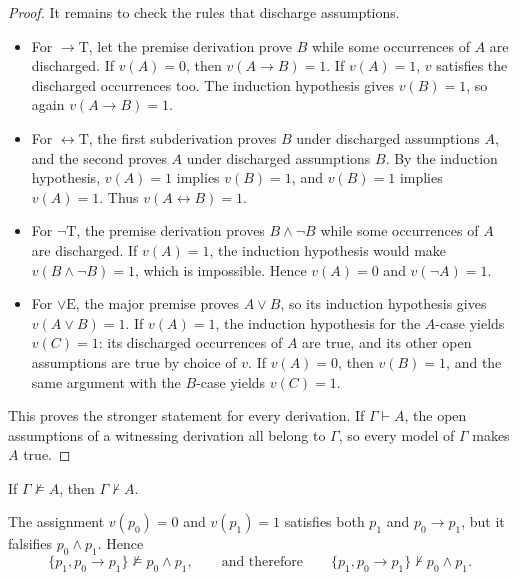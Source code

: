 \documentclass[11pt,a4paper]{amsart}
\begin{document}
\begin{proof}
  It remains to check the rules that discharge assumptions.
  \begin{itemize}
    \item For \(\to\mathrm T\), let the premise derivation prove \(B\)
      while some occurrences of \(A\) are discharged. If \(v(A)=0\), then
      \(v(A\to B)=1\). If \(v(A)=1\), \(v\) satisfies the discharged
      occurrences too. The induction hypothesis gives \(v(B)=1\), so
      again \(v(A\to B)=1\).
    \item For \(\leftrightarrow\mathrm T\), the first subderivation proves
      \(B\) under discharged assumptions \(A\), and the second proves
      \(A\) under discharged assumptions \(B\). By the induction
      hypothesis, \(v(A)=1\) implies \(v(B)=1\), and \(v(B)=1\) implies
      \(v(A)=1\). Thus \(v(A\leftrightarrow B)=1\).
    \item For \(\neg\mathrm T\), the premise derivation proves
      \(B\land\neg B\) while some occurrences of \(A\) are discharged.
      If \(v(A)=1\), the induction hypothesis would make
      \(v(B\land\neg B)=1\), which is impossible. Hence \(v(A)=0\) and
      \(v(\neg A)=1\).
    \item For \(\lor\mathrm E\), the major premise proves \(A\lor B\),
      so its induction hypothesis gives \(v(A\lor B)=1\). If \(v(A)=1\),
      the induction hypothesis for the \(A\)-case yields \(v(C)=1\): its
      discharged occurrences of \(A\) are true, and its other open
      assumptions are true by choice of \(v\). If \(v(A)=0\), then
      \(v(B)=1\), and the same argument with the \(B\)-case yields
      \(v(C)=1\).
  \end{itemize}
  This proves the stronger statement for every derivation. If
  \(\Gamma\vdash A\), the open assumptions of a witnessing derivation all
  belong to \(\Gamma\), so every model of \(\Gamma\) makes \(A\) true.
\end{proof}

\begin{corollary}
  If \(\Gamma\not\models A\), then \(\Gamma\not\vdash A\).
\end{corollary}

\begin{example}
  The assignment \(v(p_0)=0\) and \(v(p_1)=1\) satisfies both \(p_1\)
  and \(p_0\to p_1\), but it falsifies \(p_0\land p_1\). Hence
  \[
    \{p_1,p_0\to p_1\}\not\models p_0\land p_1,
    \qquad\text{and therefore}\qquad
    \{p_1,p_0\to p_1\}\not\vdash p_0\land p_1.
  \]
\end{example}
\end{document}
